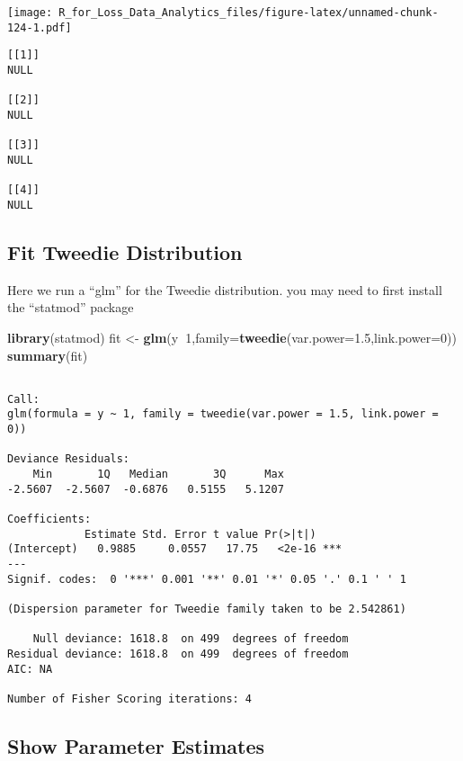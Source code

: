 \documentclass[]{book}
\newenvironment{Shaded}{\begin{snugshade}}{\end{snugshade}}
\newcommand{\KeywordTok}[1]{\textcolor[rgb]{0.13,0.29,0.53}{\textbf{#1}}}
\newcommand{\DataTypeTok}[1]{\textcolor[rgb]{0.13,0.29,0.53}{#1}}
\newcommand{\DecValTok}[1]{\textcolor[rgb]{0.00,0.00,0.81}{#1}}
\newcommand{\FloatTok}[1]{\textcolor[rgb]{0.00,0.00,0.81}{#1}}
\newcommand{\StringTok}[1]{\textcolor[rgb]{0.31,0.60,0.02}{#1}}
\newcommand{\OperatorTok}[1]{\textcolor[rgb]{0.81,0.36,0.00}{\textbf{#1}}}
\newcommand{\NormalTok}[1]{#1}
\theoremstyle{definition}
\theoremstyle{definition}
\theoremstyle{definition}
\theoremstyle{remark}
\begin{document}
\texttt{[image: R\_for\_Loss\_Data\_Analytics\_files/figure-latex/unnamed-chunk-124-1.pdf]}

\begin{verbatim}
[[1]]
NULL

[[2]]
NULL

[[3]]
NULL

[[4]]
NULL
\end{verbatim}

\subsection{Fit Tweedie Distribution}\label{fit-tweedie-distribution}

Here we run a ``glm'' for the Tweedie distribution. you may need to
first install the ``statmod'' package

\begin{Shaded}
\begin{Highlighting}[]
\KeywordTok{library}\NormalTok{(statmod)}
\NormalTok{fit <-}\StringTok{ }\KeywordTok{glm}\NormalTok{(y}\OperatorTok{~}\DecValTok{1}\NormalTok{,}\DataTypeTok{family=}\KeywordTok{tweedie}\NormalTok{(}\DataTypeTok{var.power=}\FloatTok{1.5}\NormalTok{,}\DataTypeTok{link.power=}\DecValTok{0}\NormalTok{))}
\KeywordTok{summary}\NormalTok{(fit)}
\end{Highlighting}
\end{Shaded}

\begin{verbatim}

Call:
glm(formula = y ~ 1, family = tweedie(var.power = 1.5, link.power = 0))

Deviance Residuals: 
    Min       1Q   Median       3Q      Max  
-2.5607  -2.5607  -0.6876   0.5155   5.1207  

Coefficients:
            Estimate Std. Error t value Pr(>|t|)    
(Intercept)   0.9885     0.0557   17.75   <2e-16 ***
---
Signif. codes:  0 '***' 0.001 '**' 0.01 '*' 0.05 '.' 0.1 ' ' 1

(Dispersion parameter for Tweedie family taken to be 2.542861)

    Null deviance: 1618.8  on 499  degrees of freedom
Residual deviance: 1618.8  on 499  degrees of freedom
AIC: NA

Number of Fisher Scoring iterations: 4
\end{verbatim}

\subsection{Show Parameter Estimates}\label{show-parameter-estimates}
\end{document}
